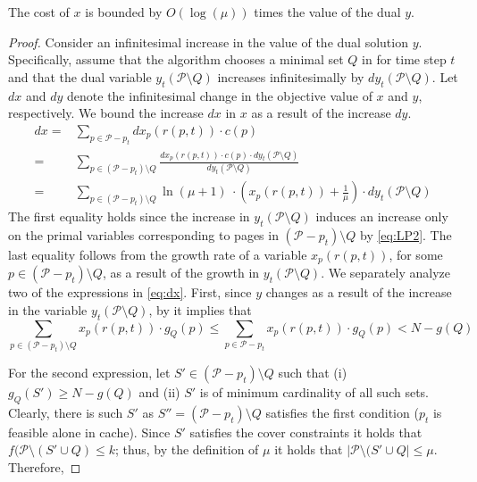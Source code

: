 \documentclass[11pt]{article}
\newcommand{\cP}{{\mathcal{P}}}
\begin{document}
%
	\begin{lemma}
	\label{thm:logL1}
The cost of $x$ is bounded by $O(\log (\mu))$ times the value of the dual $y$. 
\end{lemma}

\begin{proof}
	Consider an infinitesimal increase in the value of the dual solution $y$. Specifically, assume that the algorithm chooses a minimal set $Q$ in  for time step $t$ and that the dual variable $y_t(\cP \setminus Q)$ increases infinitesimally by $d y_t(\cP \setminus Q)$. Let $dx$ and $dy$ denote the infinitesimal change in the objective value of $x$ and $y$, respectively. We bound the increase $dx$ in $x$ as a result of the increase $dy$.   
\begin{equation}
	\label{eq:dx}
	\begin{aligned}
		dx ={} & \sum_{p \in \cP-p_t} d x_p(r(p,t)) \cdot c(p) \\
		={} & \sum_{p \in (\cP-p_t) \setminus Q}  \frac{d x_p(r(p,t)) \cdot c(p) \cdot d y_t(\cP \setminus Q)}{d y_t(\cP \setminus Q)} \\
		={} & \sum_{p \in (\cP-p_t) \setminus Q} \ln \left(\mu+1 \right)\ \cdot \left( x_p(r(p,t))+\frac{1}{\mu} \right) \cdot d y_t(\cP \setminus Q)
	\end{aligned}
\end{equation} The first equality holds since the increase in $y_t(\cP \setminus Q)$ induces an increase only on the primal variables corresponding to pages in $(\cP-p_t) \setminus Q$ by \eqref{eq:LP2}. The last equality follows from the growth rate of a variable $x_p(r(p,t))$, for some $p \in \left(\cP-p_t\right) \setminus Q$, as a result of the growth in $y_t(\cP \setminus Q)$. %
We separately analyze two of the expressions in \eqref{eq:dx}. First, since $y$ changes as a result of the increase in the variable $y_t(\cP \setminus Q)$, by  it implies that 
\begin{equation}
	\label{eq:InwhileF}
	\sum_{p \in \left(\cP-p_t\right) \setminus Q} x_p(r(p,t)) \cdot g_Q(p) \leq 	\sum_{p \in \cP-p_t} x_p(r(p,t)) \cdot g_Q(p) < N-g(Q)
\end{equation} %


For the second expression, let $S' \in \left(\cP-p_t\right) \setminus Q$ such that (i) $g_Q(S') \geq N-g(Q)$ and (ii) $S'$ is of minimum cardinality of all such sets. Clearly, there is such $S'$ as $S'' = \left(\cP-p_t\right) \setminus Q$ satisfies the first condition ($p_t$ is feasible alone in cache). Since $S'$ satisfies the cover constraints it holds that $f(\cP \setminus (S' \cup Q) \leq k$; thus, by the definition of $\mu$ it holds that $|\cP \setminus (S' \cup Q| \leq \mu$. Therefore,  
	



\end{proof}
\end{document}
